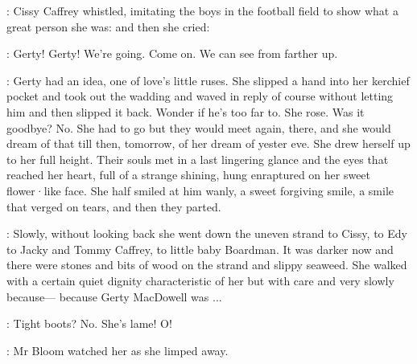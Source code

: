 :
Cissy Caffrey whistled,
imitating the boys in the football field
to show what a great person she was:
and then she cried:

\cissy:
Gerty!
Gerty!
We're going.
Come on.
We can see from farther up.

:
Gerty had an idea,
one of love's little ruses.
She slipped a hand
into her kerchief pocket
and took out the wadding
and waved in reply
of course
without letting him
and then slipped it back.
Wonder if he's too far to.
She rose.
Was it goodbye?
No.
She had to go
but they would meet again,
there,
and she would dream of that till then,
tomorrow,
of her dream of yester eve.
She drew herself up to her full height.
Their souls met
in a last lingering glance
and the eyes that reached her heart,
full of a strange shining,
hung enraptured
on her sweet flower·like face.
She half smiled at him wanly,
a sweet forgiving smile,
a smile that verged on tears,
and then they parted.

:
Slowly,
without looking back
she went down the uneven strand to Cissy,
to Edy
to Jacky and Tommy Caffrey,
to little baby Boardman.
It was darker now
and there were stones and bits of wood
on the strand
and slippy seaweed.
She walked with a certain quiet dignity characteristic of her
but with care
and very slowly because—%
because Gerty MacDowell was ...

\Bloom:
Tight boots?
No.
She's lame!
O!

:
Mr Bloom watched her
as she limped away.

